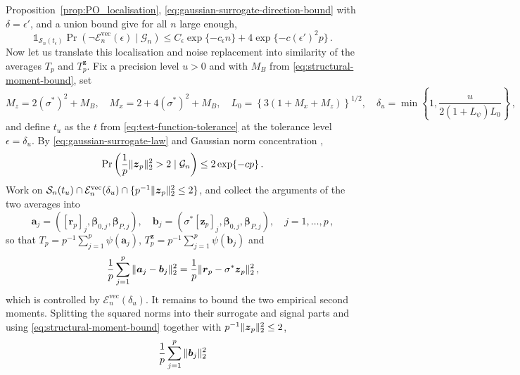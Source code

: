 \documentclass{article}
\makeatletter
\theoremstyle{definition}
\newcommand{\vnorm}[1]{%
	\ensuremath{%
		\if@display
		\left\| #1 \right\|
		\else
		\| #1 \|
		\fi
	}%
}
\newcommand*{\bb}{\boldsymbol}
\def\bbeta{\bb{\beta}}
\makeatother
\begin{document}
\begin{bibunit}
Proposition~\ref{prop:PO_localisation},
\eqref{eq:gaussian-surrogate-direction-bound} with
$\delta=\epsilon'$, and a union bound give for all $n$ large enough, 
\begin{equation}
\label{eq:test_function_vec_bound}
    \mathds{1}_{\mathcal S_n(t_\epsilon)}
    \Pr
    \left(
        \lnot\mathcal E_n^{\mathrm{vec}}(\epsilon)
        \mid
        \mathcal G_n
    \right)
    \leq
    C_\epsilon
    \exp\{-c_\epsilon n\}
    +
    4\exp\{-c(\epsilon')^2p\}\,.
\end{equation}
Now let us translate this localisation and noise replacement into similarity of the averages $T_p$ and $T_p^{\bb z}$. 
Fix a precision level $u>0$ and with $M_B$ from \eqref{eq:structural-moment-bound}, set
$$
    M_z
    =
    2(\sigma^*)^2+M_B,
    \quad
    M_x
    =
    2+4(\sigma^*)^2+M_B,
    \quad
    L_0
    =
    \left\{
        3
        (
            1+M_x+M_z
        )
    \right\}^{1/2}, \quad 
    \delta_u
    =
    \min
    \left\{
        1,
        \frac{u}{2(1+L_\psi)L_0}
    \right\} \,, 
$$
and define $t_u$ as the $t$ from \eqref{eq:test-function-tolerance} at the tolerance level
$\epsilon=\delta_u$. 
By \eqref{eq:gaussian-surrogate-law} and Gaussian norm concentration
\citep[Theorem~3.1.1]{vershynin:2018},
$$
    \Pr
    \left(
        \frac1p
        \vnorm{\bb z_p}_2^2
        >
        2
        \mid
        \mathcal G_n
    \right)
    \leq
    2\exp\{-cp\}\,.
$$
Work on
$\mathcal S_n(t_u)
\cap\mathcal E_n^{\mathrm{vec}}(\delta_u)
\cap\{p^{-1}\vnorm{\bb z_p}_2^2\leq2\}$,
and collect the arguments of the two averages into
$$
    \bb a_j
    =
    (
        [\bb r_p]_j,
        \bbeta_{0,j},
        \bbeta_{P,j}
    ),
    \quad
    \bb b_j
    =
    (
        \sigma^*[\bb z_p]_j,
        \bbeta_{0,j},
        \bbeta_{P,j}
    ),
    \quad
    j=1,\ldots,p\,,
$$
so that $T_p=p^{-1}\sum_{j=1}^p\psi(\bb a_j)$, 
$T_p^{\bb z}=p^{-1}\sum_{j=1}^p\psi(\bb b_j)$ and 
$$
    \frac1p
    \sum_{j=1}^p
    \vnorm{\bb a_j-\bb b_j}_2^2
    =
    \frac1p
    \vnorm{\bb r_p-\sigma^*\bb z_p}_2^2\,,
$$
which is controlled by
$\mathcal E_n^{\mathrm{vec}}(\delta_u)$.
It remains to bound the two empirical second moments. Splitting the squared
norms into their surrogate and signal parts and using
\eqref{eq:structural-moment-bound} together with
$p^{-1}\vnorm{\bb z_p}_2^2\leq2$,
$$
    \frac1p
    \sum_{j=1}^p
    \vnorm{\bb b_j}_2^2
$$
\end{bibunit}
\end{document}
